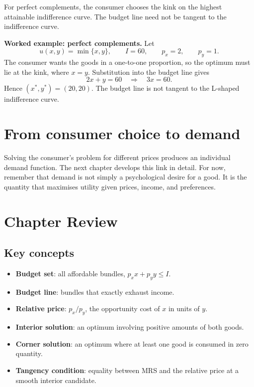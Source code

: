For perfect complements, the consumer chooses the kink on the highest attainable indifference curve. The budget line need not be tangent to the indifference curve.

\begin{exercisebox}
\textbf{Worked example: perfect complements.} Let
\[
u(x,y)=\min\{x,y\},
\qquad I=60,
\qquad p_x=2,
\qquad p_y=1.
\]
The consumer wants the goods in a one-to-one proportion, so the optimum must
lie at the kink, where $x=y$. Substitution into the budget line gives
\[
2x+y=60
\quad\Longrightarrow\quad
3x=60.
\]
Hence $(x^*,y^*)=(20,20)$. The budget line is not tangent to the L-shaped
indifference curve.
\end{exercisebox}

\section{From consumer choice to demand}

Solving the consumer's problem for different prices produces an individual
demand function. The next chapter develops this link in detail. For now,
remember that demand is not simply a psychological desire for a good. It is
the quantity that maximises utility given prices, income, and preferences.

\section*{Chapter Review}

\subsection*{Key concepts}
\begin{itemize}
  \item \textbf{Budget set}: all affordable bundles, $p_xx+p_yy\leq I$.
  \item \textbf{Budget line}: bundles that exactly exhaust income.
  \item \textbf{Relative price}: $p_x/p_y$, the opportunity cost of $x$ in units of $y$.
  \item \textbf{Interior solution}: an optimum involving positive amounts of both goods.
  \item \textbf{Corner solution}: an optimum where at least one good is consumed in zero quantity.
  \item \textbf{Tangency condition}: equality between MRS and the relative price at a smooth interior candidate.
\end{itemize}

